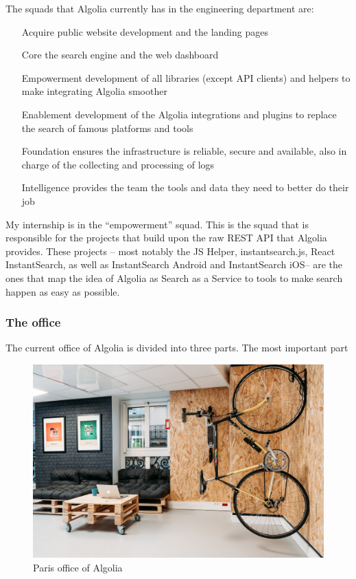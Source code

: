 
The squads that Algolia currently has in the engineering department are:

\begin{enumerate}
  \item[Acquire] public website development and the landing pages
  \item[Core] the search engine and the web dashboard
  \item[Empowerment] development of all libraries (except API clients) and helpers to make integrating Algolia smoother
  \item[Enablement] development of the Algolia integrations and plugins to replace the search of famous platforms and tools
  \item[Foundation] ensures the infrastructure is reliable, secure and available, also in charge of the collecting and processing of logs
  \item[Intelligence] provides the team the tools and data they need to better do their job
\end{enumerate}

My internship is in the ``empowerment'' squad. This is the squad that is responsible for the projects that build upon the raw REST API that Algolia provides. These projects -- most notably the JS Helper\cite{algolia-js-helper}, instantsearch.js\cite{instantsearch-js}, React InstantSearch\cite{react-instantsearch}, as well as InstantSearch Android\cite{instantsearch-android} and InstantSearch iOS\cite{instantsearch-ios}-- are the ones that map the idea of Algolia as Search as a Service to tools to make search happen as easy as possible.

\subsubsection{The office} %
\label{ssub:the_office}

The current office of Algolia is divided into three parts. The most important part

\begin{figure}[H]
  \label{figure:company-logo}
  \centering
  \includegraphics[width=\textwidth]{../assets/officelovin.jpg}
  \caption{Paris office of Algolia\cite{officelovin}}
\end{figure}

